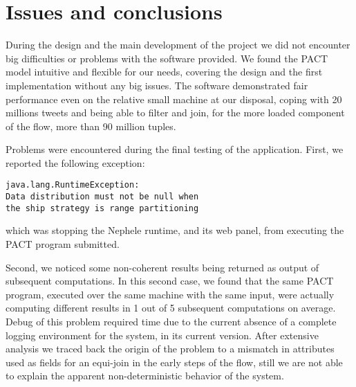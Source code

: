 \section{Issues and conclusions}
\label{sec:issues}

During the design and the main development of the project we did not encounter big difficulties or problems with the software provided.
We found the PACT model intuitive and flexible for our needs, covering the design and the first implementation without any big issues.
The software demonstrated fair performance even on the relative small machine at our disposal, coping with 20 millions tweets and being able to filter and join, for the more loaded component of the flow, more than 90 million tuples.

Problems were encountered during the final testing of the application.
First, we reported the following exception:
\begin{verbatim}
java.lang.RuntimeException: 
Data distribution must not be null when 
the ship strategy is range partitioning
\end{verbatim}
which was stopping the Nephele runtime, and its web panel, from executing the PACT program submitted.

Second, we noticed some non-coherent results being returned as output of subsequent computations.
In this second case, we found that the same PACT program, executed over the same machine with the same input, were actually computing different results in 1 out of 5 subsequent computations on average.
Debug of this problem required time due to the current absence of a complete logging environment for the system, in its current version.
After extensive analysis we traced back the origin of the problem to a mismatch in attributes used as fields for an equi-join in the early steps of the flow, still we are not able to explain the apparent non-deterministic behavior of the system. 

